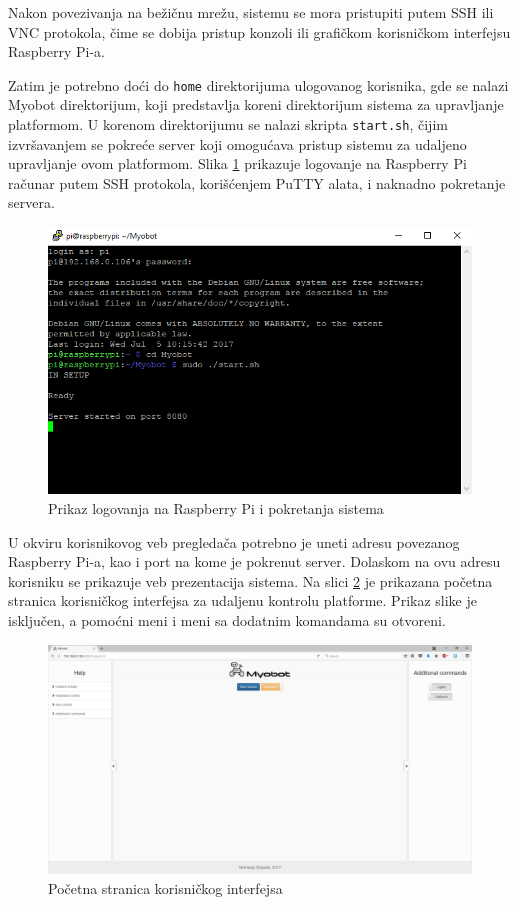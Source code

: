 \documentclass[12pt,a4paper]{report}
\begin{document}
Nakon povezivanja na bežičnu mrežu, sistemu se mora pristupiti putem SSH ili VNC protokola, čime se dobija pristup konzoli ili grafičkom korisničkom interfejsu Raspberry Pi-a.

Zatim je potrebno doći do \texttt{home} direktorijuma ulogovanog korisnika, gde se nalazi Myobot direktorijum, koji predstavlja koreni direktorijum sistema za upravljanje platformom. U korenom direktorijumu se nalazi skripta \texttt{start.sh}, čijim izvršavanjem se pokreće server koji omogućava pristup sistemu za udaljeno upravljanje ovom platformom. Slika \ref{fig:putty} prikazuje logovanje na Raspberry Pi računar putem SSH protokola, korišćenjem PuTTY alata, i naknadno pokretanje servera.

\begin{figure}[H]
    \centering
    \includegraphics[width=16cm, keepaspectratio]{img/putty.png}
    \caption{Prikaz logovanja na Raspberry Pi i pokretanja sistema}
    \label{fig:putty}
\end{figure}

U okviru korisnikovog veb pregledača potrebno je uneti adresu povezanog Raspberry Pi-a, kao i port na kome je pokrenut server. Dolaskom na ovu adresu korisniku se prikazuje veb prezentacija sistema. Na slici \ref{fig:index_with_sidebars} je prikazana početna stranica korisničkog interfejsa za udaljenu kontrolu platforme. Prikaz slike je isključen, a pomoćni meni i meni sa dodatnim komandama su otvoreni.

\begin{figure}[H]
    \centering
    \includegraphics[width=16cm, keepaspectratio]{img/index_with_sidebars.png}
    \caption{Početna stranica korisničkog interfejsa}
    \label{fig:index_with_sidebars}
\end{figure}
\end{document}
